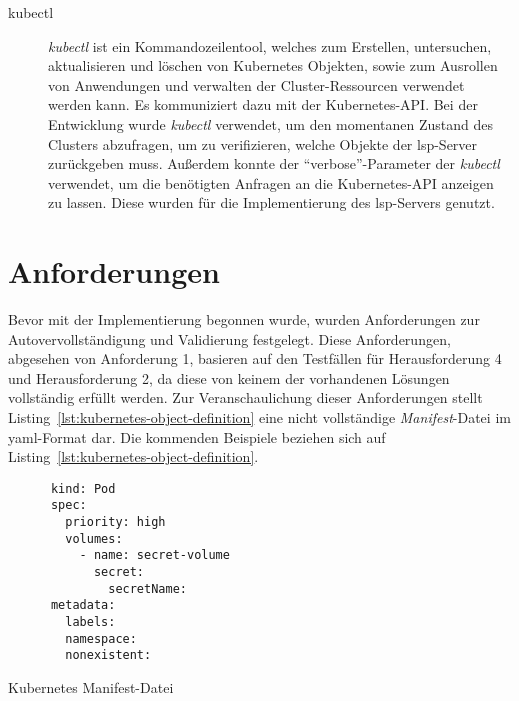 \begin{description}
  \item[kubectl]
        \textit{kubectl} ist ein Kommandozeilentool, welches zum Erstellen, untersuchen, aktualisieren und löschen von Kubernetes Objekten, sowie zum Ausrollen
        von Anwendungen und verwalten der Cluster-Ressourcen verwendet werden kann. Es kommuniziert dazu mit der Kubernetes-API.\@
        Bei der Entwicklung wurde \textit{kubectl} verwendet, um den momentanen Zustand des Clusters abzufragen,
        um zu verifizieren, welche Objekte der \ac{lsp}-Server zurückgeben muss.
        Außerdem konnte der ``verbose''-Parameter der \textit{kubectl} verwendet, um die benötigten Anfragen an die Kubernetes-API anzeigen zu lassen.
        Diese wurden für die Implementierung des \ac{lsp}-Servers genutzt.
\end{description}

\section{Anforderungen}\label{sec:requirements}

Bevor mit der Implementierung begonnen wurde, wurden Anforderungen zur Autovervollständigung und Validierung festgelegt.
Diese Anforderungen, abgesehen von Anforderung 1, basieren auf den Testfällen für Herausforderung 4 und Herausforderung 2, da diese von keinem der vorhandenen Lösungen vollständig erfüllt werden.
Zur Veranschaulichung dieser Anforderungen stellt Listing~\ref{lst:kubernetes-object-definition} eine nicht vollständige \textit{Manifest}-Datei im \ac{yaml}-Format dar.
Die kommenden Beispiele beziehen sich auf Listing~\ref{lst:kubernetes-object-definition}.

\begin{listing}[htp]
  \begin{verbatim}
      kind: Pod
      spec: 
        priority: high
        volumes: 
          - name: secret-volume
            secret: 
              secretName: 
      metadata: 
        labels: 
        namespace:
        nonexistent:
      \end{verbatim}
  \caption{Kubernetes Manifest-Datei}
  \label{lst:kubernetes-object-definition}
\end{listing}

